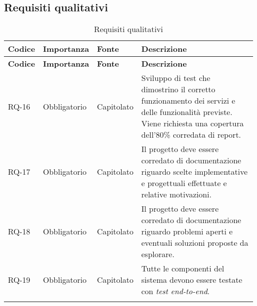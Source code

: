 \subsection{Requisiti qualitativi}
\begin{longtable}{|>{\centering\arraybackslash}m{}|>{\centering\arraybackslash}m{}|>{\centering\arraybackslash}m{}|>{\centering\arraybackslash}m{}|}
	\hline
	\textbf{Codice} & \textbf{Importanza} & \textbf{Fonte} & \textbf{Descrizione}                                                                                                                                              \\\hline
	\endfirsthead
	\textbf{Codice} & \textbf{Importanza} & \textbf{Fonte} & \textbf{Descrizione}                                                                                                                                              \\\hline
	\endhead
	RQ-16           & Obbligatorio        & Capitolato     & Sviluppo di test che dimostrino il corretto funzionamento dei servizi e delle funzionalità previste. Viene richiesta una copertura dell'80\% corredata di report. \\\hline
	RQ-17           & Obbligatorio        & Capitolato     & Il progetto deve essere corredato di documentazione riguardo scelte implementative e progettuali effettuate e relative motivazioni.                               \\\hline
	RQ-18           & Obbligatorio        & Capitolato     & Il progetto deve essere corredato di documentazione riguardo problemi aperti e eventuali soluzioni proposte da esplorare.                                         \\\hline
	RQ-19           & Obbligatorio        & Capitolato     & Tutte le componenti del sistema devono essere testate con \textit{test end-to-end}.                                                                               \\\hline
	\caption{Requisiti qualitativi}
	\label{table:2}
\end{longtable}

